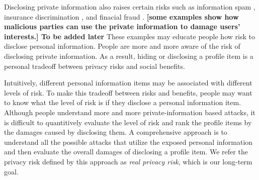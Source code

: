 \documentclass[a4paper]{article}
\begin{document}

Disclosing private information also raises certain risks such as
information spam \cite{}, insurance discrimination \cite{}, and
finacial fraud \cite{identity-theft-attack}. \textbf{[some examples
show how malicious parties can use the private information to damage
users' interests.]  To be added later} These examples may educate
people how risk to disclose personal information. People are more and
more aware of the risk of disclosing private information. As a result,
hiding or disclosing a profile item is a personal tradeoff between
privacy risks and social benefits.



Intuitively, different personal information items may be associated
with different levels of risk. To make this tradeoff between risks and
benefits, people may want to know what the level of risk is if they
disclose a personal information item. Although people understand more
and more private-information based attacks, it is difficult to
quantitively evaluate the level of risk and rank the profile items by
the damages caused by disclosing them. A comprehensive approach is to
understand all the possible attacks that utilize the exposed personal
information and then evaluate the overall damages of disclosing a
profile item. We refer the privacy risk defined by this approach as
\emph{real privacy risk}, which is our long-term goal.
\end{document}
